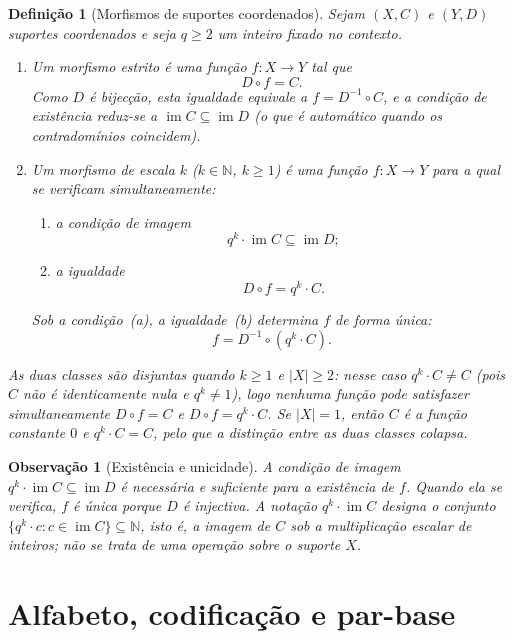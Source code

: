 \documentclass[11pt,a4paper]{article}
\newtheorem{definicao}{Definição}
\newtheorem{observacao}{Observação}
\begin{document}
\begin{definicao}[Morfismos de suportes coordenados]
\label{def:morfismos}
Sejam \((X,C)\) e \((Y,D)\) suportes coordenados e seja \(q\ge 2\) um inteiro
fixado no contexto.
\begin{enumerate}[leftmargin=1.5em]
\item Um \emph{morfismo estrito} é uma função \(f\colon X\to Y\) tal que
\[
D\circ f = C.
\]
Como \(D\) é bijecção, esta igualdade equivale a
\(f = D^{-1}\circ C\), e a condição de existência reduz-se a
\(\operatorname{im} C\subseteq\operatorname{im} D\)
(o que é automático quando os contradomínios coincidem).

\item Um \emph{morfismo de escala \(k\)} (\(k\in\mathbb N\), \(k\ge 1\))
é uma função \(f\colon X\to Y\) para a qual se verificam simultaneamente:
\begin{enumerate}[label=(\alph*)]
\item a condição de imagem
\[
q^k\cdot\operatorname{im} C
\subseteq
\operatorname{im} D;
\]
\item a igualdade
\[
D\circ f = q^k\cdot C.
\]
\end{enumerate}
Sob a condição~(a), a igualdade~(b) determina \(f\) de forma única:
\[
f = D^{-1}\circ(q^k\cdot C).
\]
\end{enumerate}
As duas classes são disjuntas quando \(k\ge 1\) e \(\lvert X\rvert\ge 2\):
nesse caso \(q^k\cdot C\neq C\) (pois \(C\) não é identicamente nula e
\(q^k\neq 1\)), logo nenhuma função pode satisfazer simultaneamente
\(D\circ f=C\) e \(D\circ f=q^k\cdot C\).
Se \(\lvert X\rvert=1\), então \(C\) é a função constante \(0\) e
\(q^k\cdot C=C\), pelo que a distinção entre as duas classes colapsa.
\end{definicao}

\begin{observacao}[Existência e unicidade]
\label{obs:compatibilidade}
A condição de imagem \(q^k\cdot\operatorname{im} C\subseteq\operatorname{im} D\)
é necessária e suficiente para a existência de \(f\).
Quando ela se verifica, \(f\) é única porque \(D\) é injectiva.
A notação \(q^k\cdot\operatorname{im} C\) designa o conjunto
\(\{q^k\cdot c:c\in\operatorname{im} C\}\subseteq\mathbb N\), isto é, a
imagem de \(C\) sob a multiplicação escalar de inteiros; não se trata de
uma operação sobre o suporte \(X\).
\end{observacao}

\section{Alfabeto, codificação e par-base}
\label{sec:alfabeto}
\end{document}
